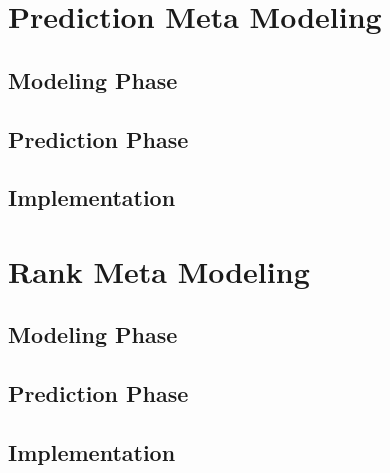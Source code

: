 \section{Prediction Meta Modeling}

\subsection{Modeling Phase}

\subsection{Prediction Phase}

\subsection{Implementation}



\section{Rank Meta Modeling}

\subsection{Modeling Phase}

\subsection{Prediction Phase}

\subsection{Implementation}


